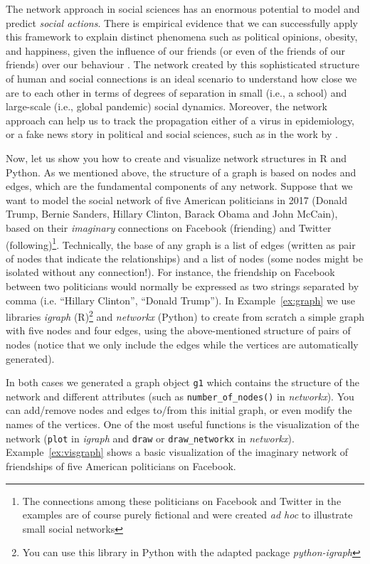 The network approach in social sciences has an enormous potential to model and predict \textit{social actions}. There is empirical evidence that we can successfully apply this framework to explain distinct phenomena such as political opinions, obesity, and happiness, given the influence of our friends (or even of the friends of our friends) over our behaviour \citep{christakis2009connected}. The network created by this sophisticated structure of human and social connections is an ideal scenario to understand how close we are to each other in terms of degrees of separation \citep{watts2004six} in small (i.e., a school) and large-scale (i.e., global pandemic) social dynamics. Moreover, the network approach can help us to track the propagation either of a virus in epidemiology, or a fake news story in political and social sciences, such as in the work by
\citet{vosoughi2018spread}.

Now, let us show you how to create and visualize network structures in R and Python. As we mentioned above, the structure of a graph is based on nodes and edges, which are the fundamental components of any network. Suppose that we want to model the social network of five American politicians in 2017 (Donald Trump, Bernie Sanders, Hillary Clinton, Barack Obama and John McCain), based on their \textit{imaginary} connections on Facebook (friending) and Twitter (following)\footnote{The connections among these politicians on Facebook and Twitter in the examples are of course purely fictional and were created \textit{ad hoc} to illustrate small social networks}. Technically, the base of any graph is a list of edges (written as pair of nodes that indicate the relationships) and a list of nodes (some nodes might be isolated without any connection!).  For instance, the friendship on Facebook between two politicians would normally be expressed as two strings separated by comma (i.e. ``Hillary Clinton'', ``Donald Trump''). In Example~\ref{ex:graph} we use libraries \emph{igraph} (R)\footnote{You can use this library in Python with the adapted package \emph{python-igraph}} and \emph{networkx} (Python) to create from scratch a simple graph with five nodes and four edges, using the above-mentioned structure of pairs of nodes (notice that we only include the edges while the vertices are automatically generated).


In both cases we generated a graph object \texttt{g1} which contains the structure of the network and different attributes (such as \verb|number_of_nodes()| in \emph{networkx}). You can add/remove nodes and edges to/from this initial graph, or even modify the names of the vertices. One of the most useful functions is the visualization of the network (\texttt{plot} in \emph{igraph} and \texttt{draw} or \texttt{draw\_networkx} in \emph{networkx}). Example~\ref{ex:visgraph} shows a basic visualization of the imaginary network of friendships of five American politicians on Facebook.


